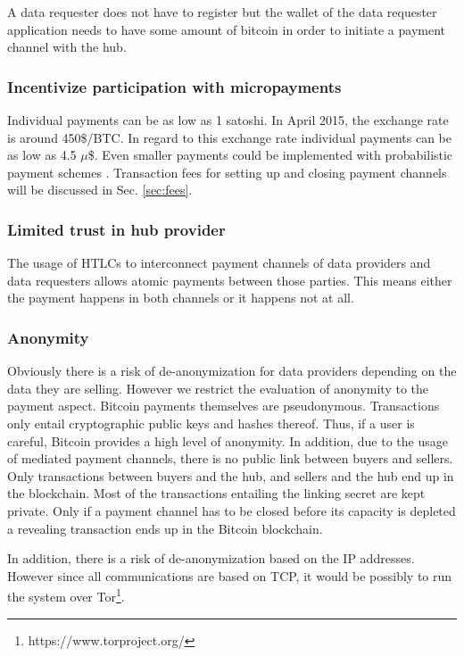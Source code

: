\documentclass[10pt,journal,compsoc]{IEEEtran}
\begin{document}
A data requester does not have to register but the wallet of the data requester application needs to have some amount of bitcoin in order to initiate a payment channel with the hub.

\subsubsection{Incentivize participation with micropayments}
Individual payments can be as low as 1 satoshi. In April 2015, the exchange rate is around 450\$/BTC. In regard to this exchange rate individual payments can be as low as 4.5 $\mu$\$. Even smaller payments could be implemented with probabilistic payment schemes \cite{Rivest1997,Pass:2015:MDC:2810103.2813713}. Transaction fees for setting up and closing payment channels will be discussed in Sec. \ref{sec:fees}. 

\subsubsection{Limited trust in hub provider}
The usage of HTLCs to interconnect payment channels of data providers and data requesters allows atomic payments between those parties. This means either the payment happens in both channels or it happens not at all. 

\subsubsection{Anonymity}
Obviously there is a risk of de-anonymization for data providers depending on the data they are selling. However we restrict the evaluation of anonymity to the payment aspect. Bitcoin payments themselves are pseudonymous. Transactions only entail cryptographic public keys and hashes thereof. Thus, if a user is careful, Bitcoin provides a high level of anonymity. In addition, due to the usage of mediated payment channels, there is no public link between buyers and sellers. Only transactions between buyers and the hub, and sellers and the hub end up in the blockchain. Most of the transactions entailing the linking secret are kept private. Only if a payment channel has to be closed before its capacity is depleted a revealing transaction ends up in the Bitcoin blockchain.

In addition, there is a risk of de-anonymization based on the IP addresses. However since all communications are based on TCP, it would be possibly to run the system over Tor\footnote{https://www.torproject.org/}.
\end{document}
